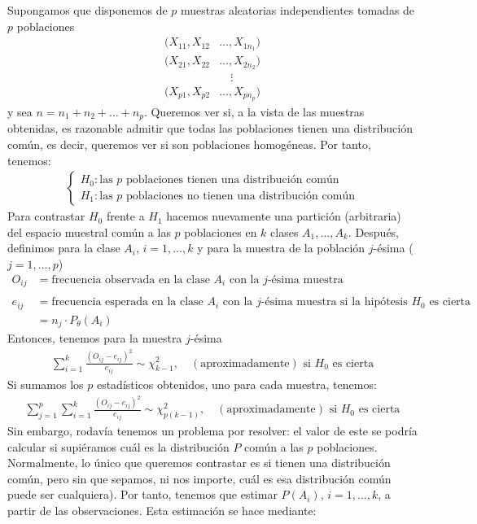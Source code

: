 \noindent Supongamos que disponemos de $p$ muestras aleatorias independientes tomadas de $p$ poblaciones
\begin{align*}
    (X_{11}, X_{12} &\ldots, X_{1n_1}) \\
    (X_{21}, X_{22} &\ldots, X_{2n_2}) \\
    & \quad \vdots \\
    (X_{p1}, X_{p2} &\ldots, X_{pn_p})
\end{align*}
y sea $n = n_1 + n_2 + \ldots + n_p$. Queremos ver si, a la vista de las muestras obtenidas, es razonable admitir que todas las poblaciones tienen una distribución común, es decir, queremos ver si son poblaciones homogéneas. Por tanto, tenemos:
\begin{align*}
    \begin{cases}
        H_0 : \text{las $p$ poblaciones tienen una distribución común} \\
        H_1 : \text{las $p$ poblaciones no tienen una distribución común}
    \end{cases}
\end{align*}
Para contrastar $H_0$ frente a $H_1$ hacemos nuevamente una partición (arbitraria) del espacio muestral común a las $p$ poblaciones en $k$ clases $A_1,\ldots,A_k$. Después, definimos para la clase $A_i$, $i=1,\ldots,k$ y para la muestra de la población $j$-ésima ($j=1,\ldots,p$)
\begin{align*}
    O_{ij} &= \text{frecuencia observada en la clase $A_i$ con la $j$-ésima muestra} \\ \\
    e_{ij} &= \text{frecuencia esperada en la clase $A_i$  con la $j$-ésima muestra si la hipótesis $H_0$ es cierta} \\
    &= n_j \cdot P_{\theta}(A_i) 
\end{align*}
Entonces, tenemos para la muestra $j$-ésima
\begin{align*}
    \sum_{i=1}^{k} \frac{(O_{ij} - e_{ij})^2}{e_{ij}} \sim \chi^2_{k-1}, \quad (\text{aproximadamente}) \text{ si $H_0$ es cierta}
\end{align*}
Si sumamos los $p$ estadísticos obtenidos, uno para cada muestra, tenemos:
\begin{align*}
    \sum_{j=1}^{p}\sum_{i=1}^{k} \frac{(O_{ij} - e_{ij})^2}{e_{ij}} \sim \chi^2_{p(k-1)}, \quad (\text{aproximadamente}) \text{ si $H_0$ es cierta}
\end{align*}
Sin embargo, rodavía tenemos un problema por resolver: el valor de este se podría calcular si supiéramos cuál es la distribución $P$ común a las $p$ poblaciones. Normalmente, lo único que queremos contrastar es si tienen una distribución común, pero sin que sepamos, ni nos importe, cuál es esa distribución común puede ser cualquiera). Por tanto, tenemos que estimar $P(A_i)$, $i=1,\ldots,k$, a partir de las observaciones. Esta estimación se hace mediante:
